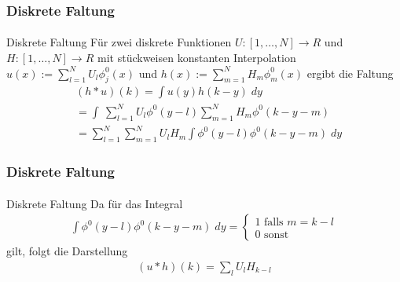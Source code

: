 \documentclass{beamer}
\begin{document}
\begin{frame}
    \frametitle{Diskrete Faltung}
\framesubtitle{}

    \begin{block}{Diskrete Faltung}
Für zwei diskrete  Funktionen $U : [1, \ldots, N]  \to R$ und $H : [1, \ldots, N]  \to R$ mit stückweisen konstanten Interpolation $u(x) := \sum_{l=1}^{N} U_l \phi^0_j(x)$ und 
$h(x) := \sum_{m=1}^{N} H_m \phi^0_m(x)$ ergibt die Faltung 
\begin{align*}
& (h * u)(k) = \int u(y)h(k-y)  \; dy \\
& = \int \ \sum_{l=1}^{N} U_l \phi^0(y-l) \sum_{m=1}^{N} H_m \phi^0(k-y-m) \\
& = \sum_{l=1}^{N}   \sum_{m=1}^{N} U_l  H_m  \int  \phi^0(y-l) \phi^0(k-y-m) \; dy 
\end{align*}

\end{block}
 \end{frame}

\begin{frame}
    \frametitle{Diskrete Faltung}
\framesubtitle{}

    \begin{block}{Diskrete Faltung}
Da für das Integral 
\begin{align*}
  \int  \phi^0(y-l) \phi^0(k-y-m)  \; dy  = \begin{cases}
1 \text{ falls } m = k -l\\
0 \text{ sonst }
\end{cases}
\end{align*}
gilt, folgt die Darstellung
\begin{align*}
 (u  * h)(k) = \sum_l U_l H_{k-l}
\end{align*}

\end{block}

 \end{frame}
\end{document}
